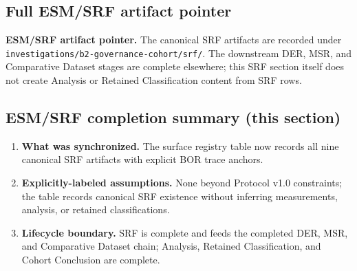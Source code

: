 \subsection{Full ESM/SRF artifact pointer}
\textbf{ESM/SRF artifact pointer.} The canonical SRF artifacts are recorded under \texttt{investigations/b2-governance-cohort/srf/}. The downstream DER, MSR, and Comparative Dataset stages are complete elsewhere; this SRF section itself does not create Analysis or Retained Classification content from SRF rows.

\subsection{ESM/SRF completion summary (this section)}
\begin{enumerate}
\item \textbf{What was synchronized.} The surface registry table now records all nine canonical SRF artifacts with explicit BOR trace anchors.
\item \textbf{Explicitly-labeled assumptions.} None beyond Protocol v1.0 constraints; the table records canonical SRF existence without inferring measurements, analysis, or retained classifications.
\item \textbf{Lifecycle boundary.} SRF is complete and feeds the completed DER, MSR, and Comparative Dataset chain; Analysis, Retained Classification, and Cohort Conclusion are complete.
\end{enumerate}
